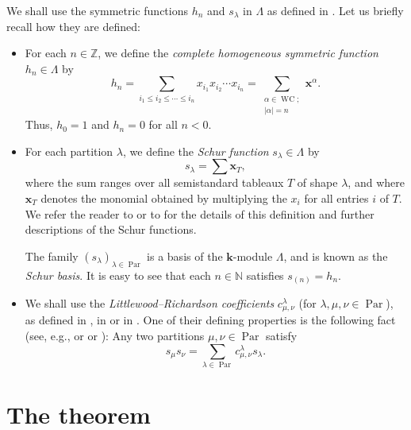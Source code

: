 \documentclass[numbers=enddot,12pt,final,onecolumn,notitlepage]{scrartcl}%
\theoremstyle{definition}
\let\sumnonlimits\sum
\renewcommand{\sum}{\sumnonlimits\limits}
\begin{document}
We shall use the symmetric functions $h_{n}$ and $s_{\lambda}$ in $\Lambda$ as
defined in \cite[Sections 2.1 and 2.2]{GriRei}. Let us briefly recall how they
are defined:

\begin{itemize}
\item For each $n\in\mathbb{Z}$, we define the \emph{complete homogeneous
symmetric function }$h_{n}\in\Lambda$ by%
\[
h_{n}=\sum_{i_{1}\leq i_{2}\leq\cdots\leq i_{n}}x_{i_{1}}x_{i_{2}}\cdots
x_{i_{n}}=\sum_{\substack{\alpha\in\operatorname*{WC};\\\left\vert
\alpha\right\vert =n}}\mathbf{x}^{\alpha}.
\]
Thus, $h_{0}=1$ and $h_{n}=0$ for all $n<0$.

\item For each partition $\lambda$, we define the \emph{Schur function
}$s_{\lambda}\in\Lambda$ by%
\[
s_{\lambda}=\sum\mathbf{x}_{T},
\]
where the sum ranges over all semistandard tableaux $T$ of shape $\lambda$,
and where $\mathbf{x}_{T}$ denotes the monomial obtained by multiplying the
$x_{i}$ for all entries $i$ of $T$. We refer the reader to \cite[Definition
2.2.1]{GriRei} or to \cite[\S 7.10]{Stanley-EC2} for the details of this
definition and further descriptions of the Schur functions.

The family $\left(  s_{\lambda}\right)  _{\lambda\in\operatorname*{Par}}$ is a
basis of the $\mathbf{k}$-module $\Lambda$, and is known as the \emph{Schur
basis}. It is easy to see that each $n\in\mathbb{N}$ satisfies $s_{\left(
n\right)  }=h_{n}$.

\item We shall use the \emph{Littlewood--Richardson coefficients }$c_{\mu,\nu
}^{\lambda}$ (for $\lambda,\mu,\nu\in\operatorname*{Par}$), as defined in
\cite[Definition 2.5.8]{GriRei}, in \cite[\S 7.15]{Stanley-EC2} or in
\cite[Chapter 10]{Egge19}. One of their defining properties is the following
fact (see, e.g., \cite[(2.5.6)]{GriRei} or \cite[(7.64)]{Stanley-EC2} or
\cite[(10.1)]{Egge19}): Any two partitions $\mu,\nu\in\operatorname*{Par}$
satisfy%
\begin{equation}
s_{\mu}s_{\nu}=\sum_{\lambda\in\operatorname*{Par}}c_{\mu,\nu}^{\lambda
}s_{\lambda}. \label{eq.lrcoeff.def}%
\end{equation}

\end{itemize}

\section{\label{sect.mainthm}The theorem}
\end{document}
